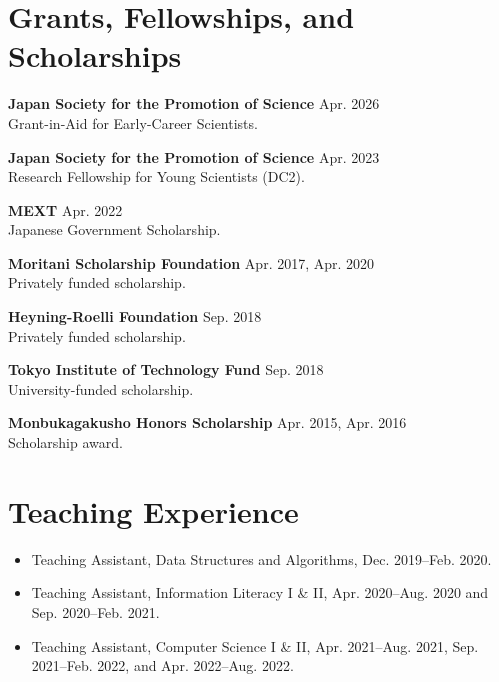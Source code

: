 \documentclass[10pt,a4paper]{article}
\newcommand{\cvitem}[3]{\textbf{#1} \hfill {\small #2}\\#3\par}
\begin{document}
\section*{Grants, Fellowships, and Scholarships}
\cvitem{Japan Society for the Promotion of Science}{Apr. 2026}{Grant-in-Aid for Early-Career Scientists.}
\cvitem{Japan Society for the Promotion of Science}{Apr. 2023}{Research Fellowship for Young Scientists (DC2).}
\cvitem{MEXT}{Apr. 2022}{Japanese Government Scholarship.}
\cvitem{Moritani Scholarship Foundation}{Apr. 2017, Apr. 2020}{Privately funded scholarship.}
\cvitem{Heyning-Roelli Foundation}{Sep. 2018}{Privately funded scholarship.}
\cvitem{Tokyo Institute of Technology Fund}{Sep. 2018}{University-funded scholarship.}
\cvitem{Monbukagakusho Honors Scholarship}{Apr. 2015, Apr. 2016}{Scholarship award.}

\section*{Teaching Experience}
\begin{itemize}
  \item Teaching Assistant, Data Structures and Algorithms, Dec. 2019--Feb. 2020.
  \item Teaching Assistant, Information Literacy I \& II, Apr. 2020--Aug. 2020 and Sep. 2020--Feb. 2021.
  \item Teaching Assistant, Computer Science I \& II, Apr. 2021--Aug. 2021, Sep. 2021--Feb. 2022, and Apr. 2022--Aug. 2022.
\end{itemize}
\end{document}
